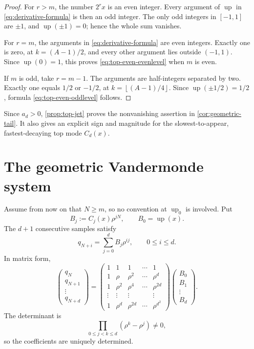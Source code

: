\documentclass[11pt,oneside]{article}
\theoremstyle{definition}
\theoremstyle{remark}
\newcommand{\up}{\operatorname{up}}
\newcommand{\floor}[1]{\left\lfloor#1\right\rfloor}
\begin{document}
\begin{proof}
For \(r>m\), the number \(2^rx\) is an even integer.  Every argument of
\(\up\) in \eqref{eq:derivative-formula} is then an odd integer.  The only
odd integers in \([-1,1]\) are \(\pm1\), and \(\up(\pm1)=0\); hence the
whole sum vanishes.

For \(r=m\), the arguments in \eqref{eq:derivative-formula} are even
integers.  Exactly one is zero, at \(k=(A-1)/2\), and every other argument
lies outside \((-1,1)\).  Since \(\up(0)=1\), this proves
\eqref{eq:top-even-evenlevel} when \(m\) is even.

If \(m\) is odd, take \(r=m-1\).  The arguments are half-integers separated
by two.  Exactly one equals \(1/2\) or \(-1/2\), at
\(k=\floor{(A-1)/4}\).  Since \(\up(\pm1/2)=1/2\), formula
\eqref{eq:top-even-oddlevel} follows.
\end{proof}

Since \(a_d>0\), \cref{prop:top-jet} proves the nonvanishing assertion in
\cref{cor:geometric-tail}.  It also gives an explicit sign and magnitude for
the slowest-to-appear, fastest-decaying top mode \(C_d(x)\).

\section{The geometric Vandermonde system}

Assume from now on that \(N\ge m\), so no convention at \(\up_0\) is
involved.  Put
\begin{equation}\label{eq:Bj}
 B_j:=C_j(x)\rho^{jN},\qquad B_0=\up(x).
\end{equation}
The \(d+1\) consecutive samples satisfy
\begin{equation}\label{eq:vandermonde-equations}
 q_{N+i}=\sum_{j=0}^{d}B_j\rho^{ij},
 \qquad 0\le i\le d.
\end{equation}
In matrix form,
\begin{equation}\label{eq:vandermonde-matrix}
 \begin{pmatrix}
 q_N\\q_{N+1}\\\vdots\\q_{N+d}
 \end{pmatrix}
 =
 \begin{pmatrix}
 1&1&1&\cdots&1\\
 1&\rho&\rho^2&\cdots&\rho^d\\
 1&\rho^2&\rho^4&\cdots&\rho^{2d}\\
 \vdots&\vdots&\vdots&&\vdots\\
 1&\rho^d&\rho^{2d}&\cdots&\rho^{d^2}
 \end{pmatrix}
 \begin{pmatrix}
 B_0\\B_1\\\vdots\\B_d
 \end{pmatrix}.
\end{equation}
The determinant is
\begin{equation}\label{eq:vandermonde-det}
 \prod_{0\le j<k\le d}(\rho^k-\rho^j)\ne0,
\end{equation}
so the coefficients are uniquely determined.
\end{document}
